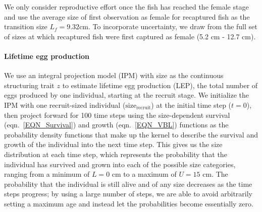 \documentclass[12pt, oneside]{article}   	%
\begin{document}
We only consider reproductive effort once the fish has reached the female stage and use the average size of first observation as female for recaptured fish as the transition size $L_f = 9.32 \text{cm}$. To incorporate uncertainty, we draw from the full set of sizes at which recaptured fish were first captured as female (5.2 cm - 12.7 cm).



\paragraph*{Lifetime egg production}
We use an integral projection model (IPM) \citep[e.g.][]{rees2014building} with size as the continuous structuring trait $z$ to estimate lifetime egg production (LEP), the total number of eggs produced by one individual, starting at the recruit stage. We initialize the IPM with one recruit-sized individual ($\text{size}_\text{recruit}$) at the initial time step ($t=0$), then project forward for 100 time steps using the size-dependent survival (eqn.\ \ref{EQN_Survival}) and growth (eqn.\ \ref{EQN_VBL}) functions as the probability density functions that make up the kernel to describe the survival and growth of the individual into the next time step. This gives us the size distribution at each time step, which represents the probability that the individual has survived and grown into each of the possible size categories, ranging from a minimum of $L=0$ cm to a maximum of $U=15$ cm. The probability that the individual is still alive and of any size decreases as the time steps progress; by using a large number of steps, we are able to avoid arbitrarily setting a maximum age and instead let the probabilities become essentially zero. 
\end{document}
